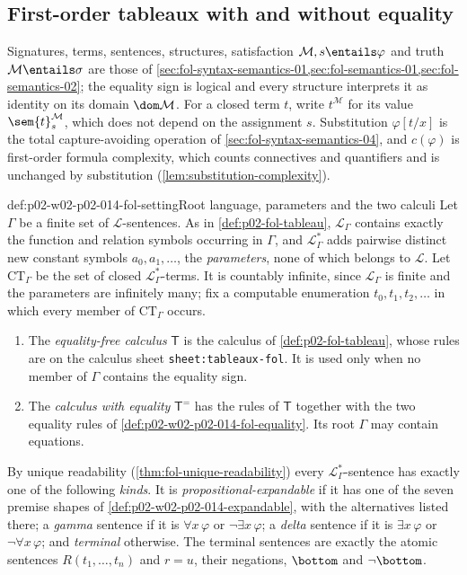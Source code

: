\subsection{First-order tableaux with and without equality}
\label{sec:p02-w02-p02-014-fol-calculus}

Signatures, terms, sentences, structures, satisfaction
\(\mathcal M,s\entails\varphi\) and truth \(\mathcal M\entails\sigma\) are
those of \cref{sec:fol-syntax-semantics-01,sec:fol-semantics-01,sec:fol-semantics-02};
the equality sign is logical and every structure interprets it as identity
on its domain \(\dom\mathcal M\).  For a closed term \(t\), write
\(t^{\mathcal M}\) for its value \(\sem{t}^{\mathcal M}_s\), which does not
depend on the assignment \(s\).  Substitution \(\varphi[t/x]\) is the total
capture-avoiding operation of \cref{sec:fol-syntax-semantics-04}, and
\(c(\varphi)\) is first-order formula complexity, which counts connectives
and quantifiers and is unchanged by substitution
(\cref{lem:substitution-complexity}).

\begin{hbconvention}{def:p02-w02-p02-014-fol-setting}{Root language, parameters and the two calculi}
Let \(\Gamma\) be a finite set of \(\mathcal L\)-sentences.  As in
\cref{def:p02-fol-tableau}, \(\mathcal L_{\Gamma}\) contains exactly the
function and relation symbols occurring in \(\Gamma\), and
\(\mathcal L_{\Gamma}^{*}\) adds pairwise distinct new constant symbols
\(a_0,a_1,\ldots\), the \emph{parameters}, none of which belongs to
\(\mathcal L\).  Let \(\mathrm{CT}_{\Gamma}\) be the set of closed
\(\mathcal L_{\Gamma}^{*}\)-terms.  It is countably infinite, since
\(\mathcal L_{\Gamma}\) is finite and the parameters are infinitely many;
fix a computable enumeration \(t_0,t_1,t_2,\ldots\) in which every member of
\(\mathrm{CT}_{\Gamma}\) occurs.
\begin{enumerate}
  \item The \emph{equality-free calculus} \(\mathsf T\) is the calculus of
        \cref{def:p02-fol-tableau}, whose rules are on the calculus sheet
        \texttt{sheet:\allowbreak tableaux-fol}.  It is used only when no
        member of \(\Gamma\) contains the equality sign.
  \item The \emph{calculus with equality} \(\mathsf T^{=}\) has the rules
        of \(\mathsf T\) together with the two equality rules of
        \cref{def:p02-w02-p02-014-fol-equality}.  Its root \(\Gamma\) may
        contain equations.
\end{enumerate}
By unique readability (\cref{thm:fol-unique-readability}) every
\(\mathcal L_{\Gamma}^{*}\)-sentence has exactly one of the following
\emph{kinds}.  It is \emph{propositional-expandable} if it has one of the
seven premise shapes of \cref{def:p02-w02-p02-014-expandable}, with the
alternatives listed there; a \emph{gamma} sentence if it is
\(\forall x\,\varphi\) or \(\neg\exists x\,\varphi\); a \emph{delta}
sentence if it is \(\exists x\,\varphi\) or \(\neg\forall x\,\varphi\); and
\emph{terminal} otherwise.  The terminal sentences are exactly the atomic
sentences \(R(t_1,\ldots,t_n)\) and \(r=u\), their negations,
\(\bottom\) and \(\neg\bottom\).
\end{hbconvention}

